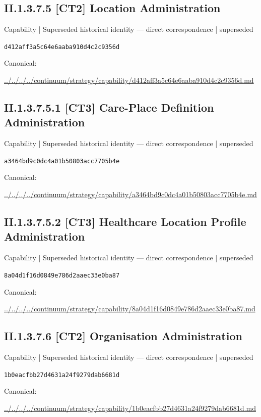 \documentclass[10pt,a4paper]{article}
\begin{document}
\subsection*{II.1.3.7.5 [CT2] Location Administration}
{\small Capability | Superseded historical identity — direct correspondence | superseded}\par
\texttt{d412aff3a5c64e6aaba910d4c2c9356d}\par
Canonical: \par
{\footnotesize\url{../../../../continuum/strategy/capability/d412aff3a5c64e6aaba910d4c2c9356d.md}}\par
\subsection*{II.1.3.7.5.1 [CT3] Care-Place Definition Administration}
{\small Capability | Superseded historical identity — direct correspondence | superseded}\par
\texttt{a3464bd9c0dc4a01b50803acc7705b4e}\par
Canonical: \par
{\footnotesize\url{../../../../continuum/strategy/capability/a3464bd9c0dc4a01b50803acc7705b4e.md}}\par
\subsection*{II.1.3.7.5.2 [CT3] Healthcare Location Profile Administration}
{\small Capability | Superseded historical identity — direct correspondence | superseded}\par
\texttt{8a04d1f16d0849e786d2aaec33e0ba87}\par
Canonical: \par
{\footnotesize\url{../../../../continuum/strategy/capability/8a04d1f16d0849e786d2aaec33e0ba87.md}}\par
\subsection*{II.1.3.7.6 [CT2] Organisation Administration}
{\small Capability | Superseded historical identity — direct correspondence | superseded}\par
\texttt{1b0eacfbb27d4631a24f9279dab6681d}\par
Canonical: \par
{\footnotesize\url{../../../../continuum/strategy/capability/1b0eacfbb27d4631a24f9279dab6681d.md}}\par
\end{document}
